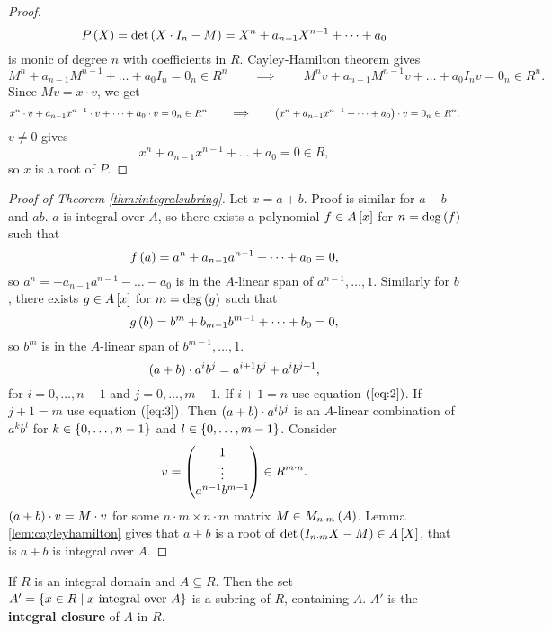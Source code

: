 \begin{proof}
$$ P\rb{X} = \det\rb{X \cdot I_n - M} = X^n + a_{n - 1}X^{n - 1} + \dots + a_0 $$
is monic of degree $ n $ with coefficients in $ R $. Cayley-Hamilton theorem gives
$$ M^n + a_{n - 1}M^{n - 1} + \dots + a_0I_n = 0_n \in R^n \qquad \implies \qquad M^nv + a_{n - 1}M^{n - 1}v + \dots + a_0I_nv = 0_n \in R^n. $$
Since $ Mv = x \cdot v $, we get
$$ x^n \cdot v + a_{n - 1}x^{n - 1} \cdot v + \dots + a_0 \cdot v = 0_n \in R^n \qquad \implies \qquad \rb{x^n + a_{n - 1}x^{n - 1} + \dots + a_0} \cdot v = 0_n \in R^n. $$
$ v \ne 0 $ gives
$$ x^n + a_{n - 1}x^{n - 1} + \dots + a_0 = 0 \in R, $$
so $ x $ is a root of $ P $.
\end{proof}

\pagebreak

\begin{proof}[Proof of Theorem \ref{thm:integralsubring}]
Let $ x = a + b $. Proof is similar for $ a - b $ and $ ab $. $ a $ is integral over $ A $, so there exists a polynomial $ f \in A\sb{x} $ for $ n = \deg\rb{f} $ such that
\begin{equation}
\label{eq:2}
f\rb{a} = a^n + a_{n - 1}a^{n - 1} + \dots + a_0 = 0,
\end{equation}
so $ a^n = -a_{n - 1}a^{n - 1} - \dots - a_0 $ is in the $ A $-linear span of $ a^{n - 1}, \dots, 1 $. Similarly for $ b $, there exists $ g \in A\sb{x} $ for $ m = \deg\rb{g} $ such that
\begin{equation}
\label{eq:3}
g\rb{b} = b^m + b_{m - 1}b^{m - 1} + \dots + b_0 = 0,
\end{equation}
so $ b^m $ is in the $ A $-linear span of $ b^{m - 1}, \dots, 1 $.
$$ \rb{a + b} \cdot a^ib^j = a^{i + 1}b^j + a^ib^{j + 1}, $$
for $ i = 0, \dots, n - 1 $ and $ j = 0, \dots, m - 1 $. If $ i + 1 = n $ use equation $ \rb{\ref{eq:2}} $. If $ j + 1 = m $ use equation $ \rb{\ref{eq:3}} $. Then $ \rb{a + b} \cdot a^ib^j $ is an $ A $-linear combination of $ a^kb^l $ for $ k \in \cb{0, \dots, n - 1} $ and $ l \in \cb{0, \dots, m - 1} $. Consider
$$ v = \threebyone{1}{\vdots}{a^{n - 1}b^{m - 1}} \in R^{m \cdot n}. $$
$ \rb{a + b} \cdot v = M \cdot v $ for some $ n \cdot m \times n \cdot m $ matrix $ M \in M_{n \cdot m}\rb{A} $. Lemma \ref{lem:cayleyhamilton} gives that $ a + b $ is a root of $ \det\rb{I_{n \cdot m}X - M} \in A\sb{X} $, that is $ a + b $ is integral over $ A $.
\end{proof}

\begin{corollary}
If $ R $ is an integral domain and $ A \subseteq R $. Then the set $ A' = \cb{x \in R \mid x \ \text{integral over} \ A} $ is a subring of $ R $, containing $ A $. $ A' $ is the \textbf{integral closure} of $ A $ in $ R $.
\end{corollary}

